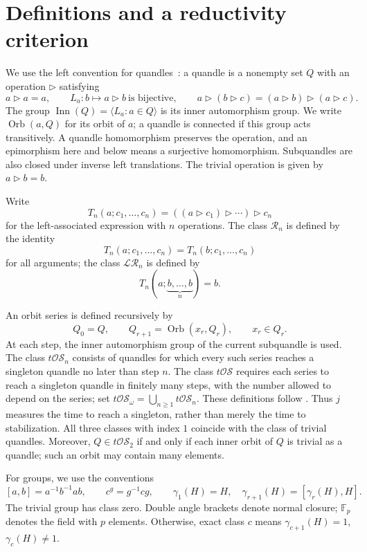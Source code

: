 \documentclass[11pt,a4paper]{article}
\theoremstyle{definition}
\theoremstyle{remark}
\newcommand{\R}{\mathcal R}
\newcommand{\LR}{\mathcal{LR}}
\newcommand{\tOS}{t\mathcal{OS}}
\newcommand{\Inn}{\operatorname{Inn}}
\newcommand{\Orb}{\operatorname{Orb}}
\newcommand{\F}{\mathbb F}
\newcommand{\conj}{\triangleright}
\begin{document}
\section{Definitions and a reductivity criterion}\label{sec:definitions}

We use the left convention for quandles~\cite{BCNW}:
a quandle is a nonempty set \(Q\) with an operation \(\conj\) satisfying
\[
 a\conj a=a,\qquad L_a:b\mapsto a\conj b\ \text{is bijective},
 \qquad a\conj(b\conj c)=(a\conj b)\conj(a\conj c).
\]
The group \(\Inn(Q)=\langle L_a:a\in Q\rangle\)
is its inner automorphism group.
We write \(\Orb(a,Q)\) for its orbit of \(a\);
a quandle is connected if this group acts transitively.
A quandle homomorphism preserves the operation, and an epimorphism
here and below means a surjective homomorphism.
Subquandles are also closed under inverse left translations.
The trivial operation is given by \(a\conj b=b\).

Write
\[
 T_n(a;c_1,\ldots,c_n)
 =((a\conj c_1)\conj\cdots)\conj c_n
\]
for the left-associated expression with \(n\) operations.
The class \(\R_n\) is defined by the identity
\[
 T_n(a;c_1,\ldots,c_n)=T_n(b;c_1,\ldots,c_n)
\]
for all arguments; the class \(\LR_n\) is defined by
\[
 T_n(a;\underbrace{b,\ldots,b}_{n})=b.
\]

An orbit series is defined recursively by
\[
 Q_0=Q,\qquad Q_{r+1}=\Orb(x_r,Q_r),\qquad x_r\in Q_r.
\]
At each step, the inner automorphism group of the current subquandle
is used. The class \(\tOS_n\) consists of quandles for which every
such series reaches a singleton quandle no later than step \(n\).
The class \(\tOS\) requires each series to reach a singleton quandle
in finitely many steps, with the number allowed to depend on the series;
set \(\tOS_\omega=\bigcup_{n\ge1}\tOS_n\).
These definitions follow \cite[Section~4.1]{BCNW}.
Thus \(j\) measures the time to reach a singleton,
rather than merely the time to stabilization.
All three classes with index \(1\) coincide with the class of trivial quandles.
Moreover, \(Q\in\tOS_2\) if and only if each inner orbit of \(Q\)
is trivial as a quandle; such an orbit may contain many elements.

For groups, we use the conventions
\[
 [a,b]=a^{-1}b^{-1}ab,\qquad c^g=g^{-1}cg,\qquad
 \gamma_1(H)=H,\quad \gamma_{r+1}(H)=[\gamma_r(H),H].
\]
The trivial group has class zero.
Double angle brackets denote normal closure;
\(\F_p\) denotes the field with \(p\) elements.
Otherwise, exact class \(c\) means
\(\gamma_{c+1}(H)=1\), \(\gamma_c(H)\ne1\).
\end{document}
